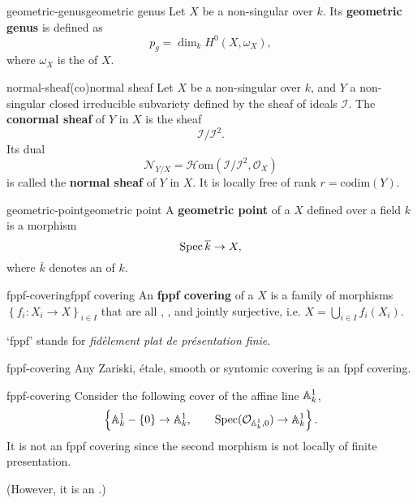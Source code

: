 \begin{topic}{geometric-genus}{geometric genus}
    Let $X$ be a non-singular  over $k$. Its \textbf{geometric genus} is defined as
    \[ p_g = \dim_k H^0(X, \omega_X) , \]
    where $\omega_X$ is the  of $X$.
\end{topic}

\begin{topic}{normal-sheaf}{(co)normal sheaf}
    Let $X$ be a non-singular  over $k$, and $Y$ a non-singular closed irreducible subvariety defined by the sheaf of ideals $\mathcal{I}$. The \textbf{conormal sheaf} of $Y$ in $X$ is the sheaf
    \[ \mathcal{I}/\mathcal{I}^2 . \]
    Its dual
    \[ \mathcal{N}_{Y/X} = \mathcal{H}\text{om}(\mathcal{I}/\mathcal{I}^2, \mathcal{O}_X) \]
    is called the \textbf{normal sheaf} of $Y$ in $X$. It is locally free of rank $r = \text{codim}(Y)$.
\end{topic}

\begin{topic}{geometric-point}{geometric point}
    A \textbf{geometric point} of a  $X$ defined over a field $k$ is a morphism
    \[ \Spec \overline{k} \to X , \]
    where $\overline{k}$ denotes an  of $k$.
\end{topic}

\begin{topic}{fppf-covering}{fppf covering}
    An \textbf{fppf covering} of a  $X$ is a family of morphisms $\left\{ f_i : X_i \to X \right\}_{i \in I}$ that are all , , and jointly surjective, i.e. $X = \bigcup_{i \in I} f_i(X_i)$.
    
    `fppf' stands for \textit{fidèlement plat de présentation finie}.
\end{topic}

\begin{example}{fppf-covering}
    Any Zariski, étale, smooth or syntomic covering is an fppf covering.
\end{example}

\begin{example}{fppf-covering}
    Consider the following cover of the affine line $\AA^1_k$,
    \[ \left\{ \AA^1_k - \{ 0 \} \to \AA^1_k, \qquad \Spec(\mathcal{O}_{\AA^1_k, 0}) \to \AA^1_k \right\} . \]
    It is not an fppf covering since the second morphism is not locally of finite presentation.
    
    (However, it is an .)
\end{example}

